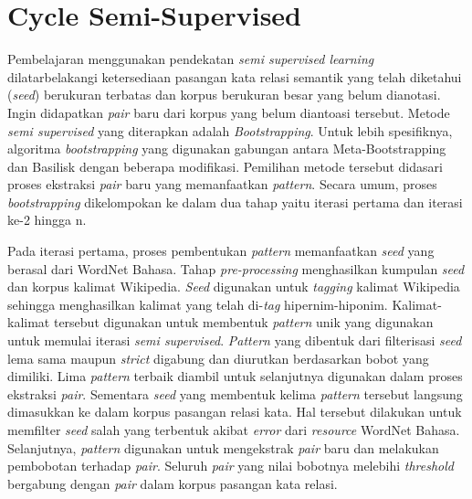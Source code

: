 \section{Cycle Semi-Supervised}
Pembelajaran menggunakan pendekatan \textit{semi supervised learning} dilatarbelakangi ketersediaan pasangan kata relasi semantik yang telah diketahui (\textit{seed}) berukuran terbatas dan korpus berukuran besar yang belum dianotasi. Ingin didapatkan \textit{pair} baru dari korpus yang belum diantoasi tersebut. Metode \textit{semi supervised} yang diterapkan adalah \textit{Bootstrapping}. Untuk lebih spesifiknya, algoritma \textit{bootstrapping} yang digunakan gabungan antara Meta-Bootstrapping dan Basilisk dengan beberapa modifikasi. Pemilihan metode tersebut didasari proses ekstraksi \textit{pair} baru yang memanfaatkan \textit{pattern}. Secara umum, proses \textit{bootstrapping} dikelompokan ke dalam dua tahap yaitu iterasi pertama dan iterasi ke-2 hingga n.

Pada iterasi pertama, proses pembentukan \textit{pattern} memanfaatkan \textit{seed} yang berasal dari WordNet Bahasa. Tahap \textit{pre-processing} menghasilkan kumpulan \textit{seed} dan korpus kalimat Wikipedia. \textit{Seed} digunakan untuk \textit{tagging} kalimat Wikipedia sehingga menghasilkan kalimat yang telah di-\textit{tag} hipernim-hiponim. Kalimat-kalimat tersebut digunakan untuk membentuk \textit{pattern} unik yang digunakan untuk memulai iterasi \textit{semi supervised}. \textit{Pattern} yang dibentuk dari filterisasi \textit{seed} lema sama maupun \textit{strict} digabung dan diurutkan berdasarkan bobot yang dimiliki. Lima \textit{pattern} terbaik diambil untuk selanjutnya digunakan dalam proses ekstraksi \textit{pair}. Sementara \textit{seed} yang membentuk kelima \textit{pattern} tersebut langsung dimasukkan ke dalam korpus pasangan relasi kata. Hal tersebut dilakukan untuk memfilter \textit{seed} salah yang terbentuk akibat \textit{error} dari \textit{resource} WordNet Bahasa. Selanjutnya, \textit{pattern} digunakan untuk mengekstrak \textit{pair} baru dan melakukan pembobotan terhadap \textit{pair}. Seluruh \textit{pair} yang nilai bobotnya melebihi \textit{threshold} bergabung dengan \textit{pair} dalam korpus pasangan kata relasi.


